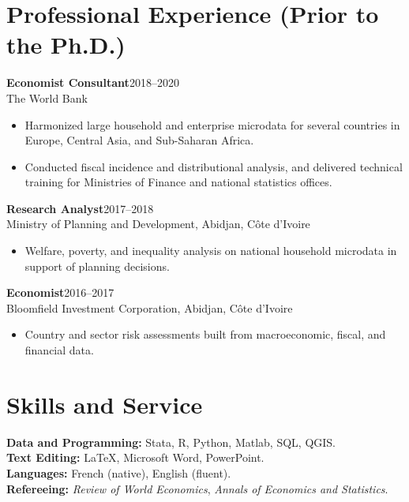 \documentclass[11pt,letterpaper]{article}
\newcommand{\entry}[2]{\textbf{#1}\hfill #2\\}
\begin{document}
\section{Professional Experience (Prior to the Ph.D.)}

\entry{Economist Consultant}{2018--2020}
The World Bank
\begin{itemize}
  \item Harmonized large household and enterprise microdata for several countries in Europe, Central Asia, and Sub-Saharan Africa.
  \item Conducted fiscal incidence and distributional analysis, and delivered technical training for Ministries of Finance and national statistics offices.
\end{itemize}

\vspace{0.35em}
\entry{Research Analyst}{2017--2018}
Ministry of Planning and Development, Abidjan, C\^ote d'Ivoire
\begin{itemize}
  \item Welfare, poverty, and inequality analysis on national household microdata in support of planning decisions.
\end{itemize}

\vspace{0.35em}
\entry{Economist}{2016--2017}
Bloomfield Investment Corporation, Abidjan, C\^ote d'Ivoire
\begin{itemize}
  \item Country and sector risk assessments built from macroeconomic, fiscal, and financial data.
\end{itemize}

\section{Skills and Service}

\textbf{Data and Programming:} Stata, R, Python, Matlab, SQL, QGIS.\\
\textbf{Text Editing:} \LaTeX, Microsoft Word, PowerPoint.\\
\textbf{Languages:} French (native), English (fluent).\\
\textbf{Refereeing:} \textit{Review of World Economics}, \textit{Annals of Economics and Statistics}.

\end{document}

